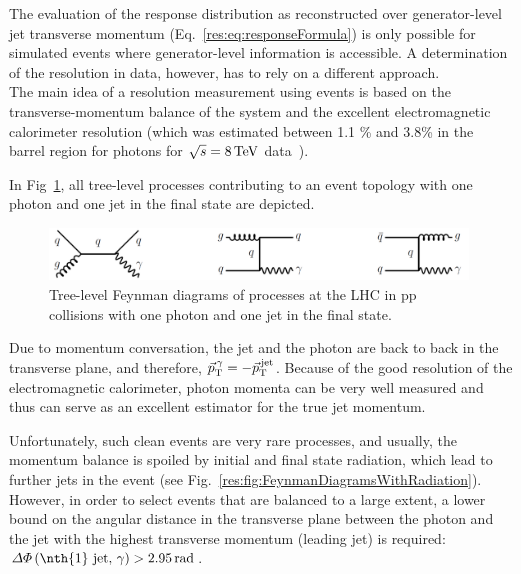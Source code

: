 
The evaluation of the response distribution as reconstructed over generator-level jet transverse momentum (Eq.~\eqref{res:eq:responseFormula})
is only possible for simulated events where generator-level information is accessible. 
A determination of the resolution in data, however, has to rely on a different approach.\\

The main idea of a resolution measurement using \GAMJET events is based on the transverse-momentum balance of the \GAMJET system and the excellent electromagnetic calorimeter resolution
(which was estimated between 1.1 \% and 3.8\% in the barrel region for photons for $\sqrt{s}=8\,\text{Te}\kern-0.06667em\text{V}$ data~\cite{bib:CMS:PhotonResolution_8TeV}).

In Fig~\ref{res:fig:FeynmanDiagrams}, all tree-level processes contributing to an event topology with one photon and one jet in the final state are depicted. 
\begin{figure}[b]
  \centering
      \includegraphics[width=0.99\textwidth]{figures/resolution/generalApproach/FeynmanDiagram.pdf}
  \caption{Tree-level Feynman diagrams of processes at the LHC in pp collisions with one photon and one jet in the final state.}  
  \label{res:fig:FeynmanDiagrams}
\end{figure}
Due to momentum conversation, the jet and the photon are back to back in the transverse plane, and therefore, $\vec{p}_{\text{T}}^{\,\gamma} = -\vec{p}_{\text{T}}^{\,\text{jet}}$. 
Because of the good resolution of the electromagnetic calorimeter, photon momenta can be very well measured 
and thus can serve as an excellent estimator for the true jet momentum.


Unfortunately, such clean events are very rare processes, and usually, the momentum balance is spoiled by initial and final state radiation, which lead to further jets in the event 
(see Fig.~\ref{res:fig:FeynmanDiagramsWithRadiation}). 
However, in order to select events that are balanced to a large extent, a lower bound 
on the angular distance in the transverse plane between the photon and the jet with the highest transverse momentum (leading jet) is required: $\Delta\Phi \left(\text{\nth{1} jet, } \gamma \right)>2.95\,\unit{rad}$. 


